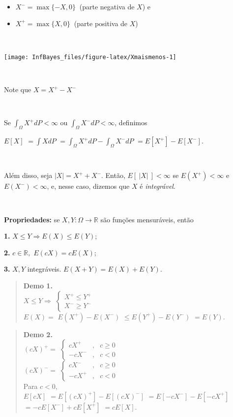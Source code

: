 \documentclass[
]{book}
\begin{document}
\begin{itemize}
\item
  \(X^- = \max\{-X,0\}~\) (parte negativa de \(X\)) e
\item
  \(X^+ = \max\{X,0\}~\) (parte positiva de \(X\))
\end{itemize}

\(~\)

\begin{center}\texttt{[image: InfBayes\_files/figure-latex/Xmaismenos-1]} \end{center}

\(~\)

Note que \(X = X^+ - X^-\)

\(~\)

Se \(\displaystyle\int_\Omega X^+ dP < \infty\) ou \(\displaystyle\int_\Omega X^- dP < \infty\), definimos

\(E[X]\) \(=\displaystyle\int X dP\) \(=\displaystyle\int_\Omega X^+dP - \int_\Omega X^- dP\) \(=E\left[X^+\right] - E\left[X^-\right]\).

\(~\)

Além disso, seja \(|X| = X^+ + X^-\). Então, \(E\left[~|X|~\right] < \infty\) se \(E(X^+) < \infty\) e \(E(X^-) < \infty\), e, nesse caso, dizemos que \(X\) é \emph{integrável}.

\(~\)

\textbf{Propriedades:} se \(X, Y: \Omega \longrightarrow \mathbb{R}\) são funções mensuráveis, então

\textbf{1.} \(X \leq Y \Rightarrow E(X) \leq E(Y)\);

\textbf{2.} \(c \in \mathbb{R},\) \(E(cX) = cE(X)\);

\textbf{3.} \(X,Y\) integráveis. \(E(X+Y) = E(X) + E(Y)\).

\begin{quote}
\textbf{Demo 1.}\\
\(X \leq Y \Rightarrow\) \(\left\{\begin{array}{c}X^+ \leq Y^+\\ X^- \geq Y^-\end{array}\right.\)\\
\(E(X) =\) \(E(X^+) - E(X^-)\) \(\leq E(Y^+) - E(Y^-)\) \(=E(Y).\)
\end{quote}

\begin{quote}
\textbf{Demo 2.}\\
\((cX)^+ =\) \(\left\{\begin{array}{rcl}cX^+ &,& c \geq 0\\ -cX^- &,& c < 0 \end{array}\right.\)\\
\((cX)^- =\) \(\left\{\begin{array}{rcl}cX^- &,& c \geq 0\\ -cX^+ &,& c < 0 \end{array}\right.\)\\
Para \(c<0\),\\
\(E[cX]\) \(= E[(cX)^+] - E[(cX)^-]\) \(= E[-cX^-] - E[-cX^+]\) \(= -cE[X^-] + cE[X^+]\) \(= cE[X]\).
\end{quote}
\end{document}
